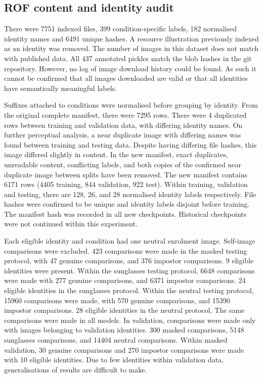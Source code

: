 \documentclass[10pt,lettersize,journal]{IEEEtran}
\begin{document}
\subsection{ROF content and identity audit}
There were 7751 indexed files, 399 condition-specific labels, 182 normalised identity names and 6491 unique hashes. A resource illustration previously indexed as an identity was removed. The number of images in this dataset does not match with published data. All 437 annotated pickles match the blob hashes in the git repository. However, no log of image download history could be found. As such it cannot be confirmed that all images downloaded are valid or that all identities have semantically meaningful labels.\par
Suffixes attached to conditions were normalised before grouping by identity. From the original complete manifest, there were 7295 rows. There were 4 duplicated rows between training and validation data, with differing identity names. On further perceptual analysis, a near duplicate image with differing names was found between training and testing data. Despite having differing file hashes, this image differed slightly in content. In the new manifest, exact duplicates, unreadable content, conflicting labels, and both copies of the confirmed near duplicate image between splits have been removed. The new manifest contains 6171 rows (4405 training, 844 validation, 922 test). Within training, validation and testing, there are 128, 26, and 28 normalised identity labels respectively. File hashes were confirmed to be unique and identity labels disjoint before training. The manifest hash was recorded in all new checkpoints. Historical checkpoints were not continued within this experiment.\par
Each eligible identity and condition had one neutral enrolment image. Self-image comparisons were excluded. 423 comparisons were made in the masked testing protocol, with 47 genuine comparisons, and 376 impostor comparisons. 9 eligible identities were present. Within the sunglasses testing protocol, 6648 comparisons were made with 277 genuine comparisons, and 6371 impostor comparisons. 24 eligible identities in the sunglasses protocol. Within the neutral testing protocol, 15960 comparisons were made, with 570 genuine comparisons, and 15390 impostor comparisons. 28 eligible identities in the neutral protocol. The same comparisons were made in all models. In validation, comparisons were made only with images belonging to validation identities. 300 masked comparisons, 5148 sunglasses comparisons, and 14404 neutral comparisons. Within masked validation, 30 genuine comparisons and 270 impostor comparisons were made with 10 eligible identities. Due to few identities within validation data, generalisations of results are difficult to make.\par
\end{document}
